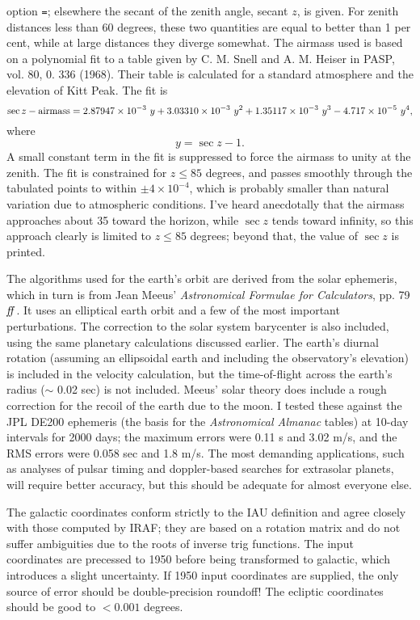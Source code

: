 option {\tt =}; elsewhere the secant of the zenith angle, secant $z$,
is given.  For zenith distances less than 60 degrees, these two quantities
are equal to better than 1 per cent, while at large distances they
diverge somewhat.  The airmass used is based on a polynomial fit to 
a table given by C. M. Snell and A. M. Heiser in PASP, vol. 80, 0. 336 (1968).
Their table is calculated for a standard atmosphere and the elevation
of Kitt Peak.  The fit is
$$\sec z - \hbox{airmass} = 2.87947 \times 10^{-3}\ y +  3.03310 \times 10^{-3}\ y^2 + 1.35117 \times 10^{-3}\ y^3 - 4.717 \times 10^{-5}\ y^4, $$
where
$$ y = \sec z - 1.$$
A small constant term in the fit is suppressed to force the airmass to 
unity at the zenith.  The fit is constrained for $z \le 85$ degrees, and
passes smoothly through the tabulated points to within $\pm 4 \times 10^{-4}$, 
which is probably smaller than natural variation due to atmospheric
conditions.  I've heard anecdotally that the airmass approaches about
35 toward the horizon, while $\sec z$ tends toward infinity, so this
approach clearly is limited to $z \le 85$ degrees; beyond that, 
the value of $\sec z$ is printed.
\par
{}

The algorithms used for the earth's orbit are derived from the solar 
ephemeris, which in turn is from Jean Meeus' 
{\it Astronomical Formulae for Calculators}, pp. 79$\it ff$.  It uses 
an elliptical earth orbit and a few of the most important perturbations.  
The correction to the solar system barycenter is also included, using the same
planetary calculations discussed earlier.  
The earth's diurnal rotation (assuming an ellipsoidal earth and 
including the observatory's elevation) 
is included in the velocity calculation, but the time-of-flight across
the earth's radius ($\sim$ 0.02 sec) is not included.
Meeus' solar theory does include a rough correction for the recoil of
the earth due to the moon.
I tested these against the JPL DE200 ephemeris (the basis for the 
{\it Astronomical Almanac} tables) at 10-day intervals for 
2000 days; the maximum errors were 0.11 s and 3.02 m/s,
and the RMS errors were 0.058 sec and 1.8 m/s.
The most demanding applications, such as analyses of pulsar
timing and doppler-based searches for extrasolar planets, will require
better accuracy, but this should be adequate for almost everyone else.

\par
The galactic coordinates conform strictly to the IAU definition and
agree closely with those computed by IRAF; they are based on a
rotation matrix and do not suffer ambiguities due to the roots of
inverse trig functions.  
The input coordinates are precessed to 1950 before being 
transformed to galactic, which introduces a slight 
uncertainty.  If 1950 input coordinates are supplied,
the only source of error should be double-precision roundoff!
The ecliptic coordinates should be good to $< 0.001$ degrees.


